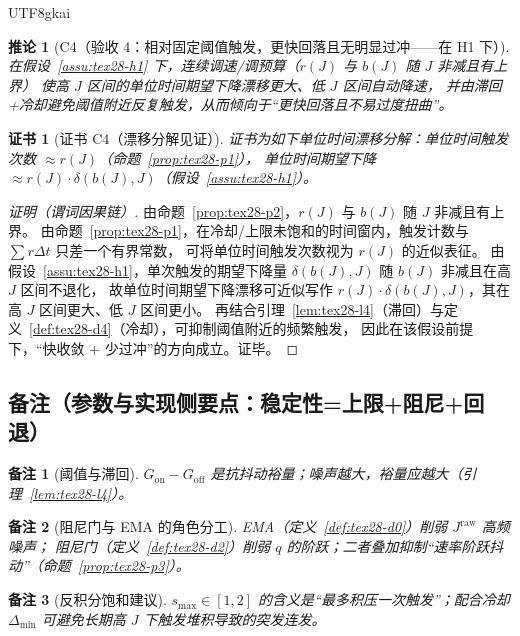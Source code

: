 \documentclass[12pt]{article}
\newtheorem{corollary}{推论}[section]
\newtheorem{remark}{备注}[section]
\newtheorem{Certificate}{证书}[section]
\begin{document}
\begin{CJK*}{UTF8}{gkai}
\begin{corollary}[C4（验收 4：相对固定阈值触发，更快回落且无明显过冲——在 H1 下）]
\label{cor:tex28-c4}
在假设~\ref{assu:tex28-h1} 下，连续调速/调预算（$r(J)$ 与 $b(J)$ 随 $J$ 非减且有上界）
使高 $J$ 区间的单位时间期望下降漂移更大、低 $J$ 区间自动降速，
并由滞回+冷却避免阈值附近反复触发，从而倾向于“更快回落且不易过度扭曲”。
\end{corollary}

\begin{Certificate}[证书 C4（漂移分解见证）]
\label{cert:tex28-c4}
证书为如下单位时间漂移分解：单位时间触发次数 $\approx r(J)$（命题~\ref{prop:tex28-p1}），
单位时间期望下降 $\approx r(J)\cdot \delta(b(J),J)$（假设~\ref{assu:tex28-h1}）。
\end{Certificate}

\begin{proof}[证明（谓词因果链）]
由命题~\ref{prop:tex28-p2}，$r(J)$ 与 $b(J)$ 随 $J$ 非减且有上界。
由命题~\ref{prop:tex28-p1}，在冷却/上限未饱和的时间窗内，触发计数与 $\sum r\Delta t$ 只差一个有界常数，
可将单位时间触发次数视为 $r(J)$ 的近似表征。
由假设~\ref{assu:tex28-h1}，单次触发的期望下降量 $\delta(b(J),J)$ 随 $b(J)$ 非减且在高 $J$ 区间不退化，
故单位时间期望下降漂移可近似写作 $r(J)\cdot \delta(b(J),J)$，其在高 $J$ 区间更大、低 $J$ 区间更小。
再结合引理~\ref{lem:tex28-l4}（滞回）与定义~\ref{def:tex28-d4}（冷却），可抑制阈值附近的频繁触发，
因此在该假设前提下，“快收敛 + 少过冲”的方向成立。证毕。
\end{proof}

\subsection{备注（参数与实现侧要点：稳定性=上限+阻尼+回退）}
\label{subsec:tex28-remarks}

\begin{remark}[阈值与滞回]
$G_{\mathrm{on}}-G_{\mathrm{off}}$ 是抗抖动裕量；噪声越大，裕量应越大（引理~\ref{lem:tex28-l4}）。
\end{remark}

\begin{remark}[阻尼门与 EMA 的角色分工]
EMA（定义~\ref{def:tex28-d0}）削弱 $J^{\mathrm{raw}}$ 高频噪声；
阻尼门（定义~\ref{def:tex28-d2}）削弱 $q$ 的阶跃；二者叠加抑制“速率阶跃抖动”（命题~\ref{prop:tex28-p3}）。
\end{remark}

\begin{remark}[反积分饱和建议]
$s_{\max}\in[1,2]$ 的含义是“最多积压一次触发”；配合冷却 $\Delta_{\min}$ 可避免长期高 $J$ 下触发堆积导致的突发连发。
\end{remark}


\end{CJK*}
\end{document}
